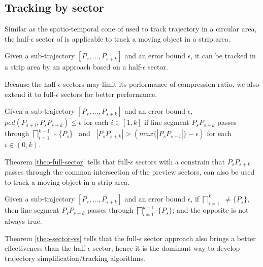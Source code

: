 \subsection{Tracking by sector}

Similar as the spatio-temporal cone of \sed used to track trajectory in a circular area, the half-$\epsilon$ sector of \ped is applicable to track a moving object in a strip area. 



\begin{theorem}
	\label{theo-half-sector}
	Given a sub-trajectory $[P_s,...,P_{s+k}]$ and an error bound $\epsilon$, it can be tracked in a strip area by an approach based on a half-$\epsilon$ sector.
\end{theorem}

Because the half-$\epsilon$ sectors may limit its performance of compression ratio, we also extend it to full-$\epsilon$ sectors for better performance.

\begin{theorem}
	\label{theo-full-sector}
	Given a sub-trajectory $[P_s,...,P_{s+k}]$ and an error bound $\epsilon$, $ped(P_{s+i}, \overline{P_sP_{s+k}})\le \epsilon$ for each $i \in [1,k]$ if line segment $\overline{P_sP_{s+k}}$ passes through $\bigsqcap_{i=1}^{k-1}$ - \{$P_s$\} ~and~ $|P_sP_{s+k}| > (max\{|P_sP_{s+i}|\} - \epsilon)$ for each $i \in (0, k)$.
\end{theorem}

Theorem \ref{theo-full-sector} tells that full-$\epsilon$ sectors with a constrain that $\overline{P_sP_{s+k}}$ passes through the common intersection of the preview sectors, can also be used to track a moving object in a strip area.

\begin{theorem}
	\label{theo-sector-vs}
	Given a sub-trajectory $[P_s,...,P_{s+k}]$ and an error bound $\epsilon$, if $\bigsqcap_{i=1}^{k}$ $\ne \{P_s\}$, then line segment $\overline{P_sP_{s+k}}$ passes through $\bigsqcap_{i=1}^{k-1}$-$\{P_s\}$; and the opposite is not always true.
\end{theorem}

Theorem \ref{theo-sector-vs} tells that the full-$\epsilon$ sector approach also brings a better effectiveness than the half-$\epsilon$ sector, hence it is the dominant way to develop trajectory simplification/tracking algorithms.


